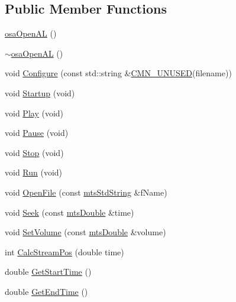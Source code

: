 \subsection*{Public Member Functions}
\begin{DoxyCompactItemize}
\item 
\hyperlink{classosa_open_a_l_a6dcad24149586594c8e0c61e6f0ec3da}{osa\+Open\+A\+L} ()
\item 
\hyperlink{classosa_open_a_l_a9945100e88e0a032d3d7d75e3e7f2489}{$\sim$osa\+Open\+A\+L} ()
\item 
void \hyperlink{classosa_open_a_l_afc5082b0168b07d0476801d1f6cb94cf}{Configure} (const std\+::string \&\hyperlink{cmn_portability_8h_a021894e2626935fa2305434b1e893ff6}{C\+M\+N\+\_\+\+U\+N\+U\+S\+E\+D}(filename))
\item 
void \hyperlink{classosa_open_a_l_ac9437555735a6dbc7503927558b07171}{Startup} (void)
\item 
void \hyperlink{classosa_open_a_l_a7a54efebb58461d129afa38b92040c5b}{Play} (void)
\item 
void \hyperlink{classosa_open_a_l_a900c4a3484d73df01c5d9fcd1ef7fc1b}{Pause} (void)
\item 
void \hyperlink{classosa_open_a_l_a599124840c7c9f602f478eeb6d306907}{Stop} (void)
\item 
void \hyperlink{classosa_open_a_l_a4a84c989bb02d989b834b8d0ac1b4a9c}{Run} (void)
\item 
void \hyperlink{classosa_open_a_l_a861dc93ae29ea94b062f903b8c696354}{Open\+File} (const \hyperlink{mts_generic_object_proxy_8h_adbc21bfbf98367e582bf8a263b7e711f}{mts\+Std\+String} \&f\+Name)
\item 
void \hyperlink{classosa_open_a_l_a971e4d95c754d4a32e32151a08473512}{Seek} (const \hyperlink{mts_generic_object_proxy_8h_a31e76b0190a8d3f9838626cd7b47bd75}{mts\+Double} \&time)
\item 
void \hyperlink{classosa_open_a_l_aa3a4cd3fca80e59381fb7b145e762952}{Set\+Volume} (const \hyperlink{mts_generic_object_proxy_8h_a31e76b0190a8d3f9838626cd7b47bd75}{mts\+Double} \&volume)
\item 
int \hyperlink{classosa_open_a_l_adaacda1e33da3799d8b565e2518a00be}{Calc\+Stream\+Pos} (double time)
\item 
double \hyperlink{classosa_open_a_l_a6db32eb47965e8be33ee3c8dce52f8da}{Get\+Start\+Time} ()
\item 
double \hyperlink{classosa_open_a_l_a2abb80021e9a6a25c6e4ad993174f120}{Get\+End\+Time} ()
\item 

\end{DoxyCompactItemize}
